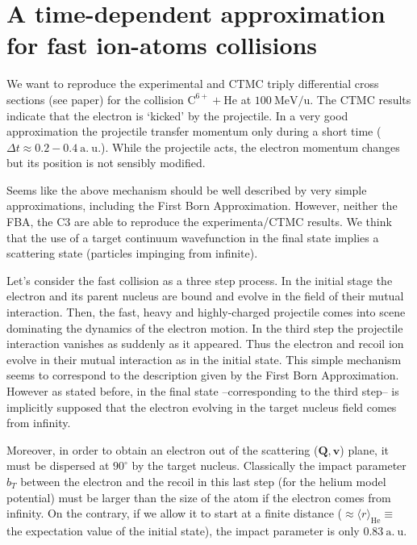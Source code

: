 \chapter{A time-dependent approximation for fast ion-atoms collisions}


We want to reproduce the experimental and CTMC triply differential
cross sections (see paper) for the collision $\mathrm{C}^{6+} +
\mathrm{He}$ at $100~\mathrm{MeV/u}$. The CTMC results indicate that
the electron is `kicked' by the projectile. In a very good
approximation the projectile transfer momentum only during a short time
($\Delta t \approx 0.2-0.4\mathrm{~a.~u.}$). While the projectile acts,
the electron momentum changes but its position is not sensibly
modified.

Seems like the above mechanism should be well described by very simple
approximations, including the First Born Approximation. However,
neither the FBA, the C3 are able to reproduce the experimenta/CTMC
results.
%
We think that the use of a target continuum wavefunction in the final
state implies a scattering state (particles impinging from infinite).

Let's consider the fast collision as a three step process. In the
initial stage the electron and its parent nucleus are bound and evolve
in the field of their mutual interaction. Then, the fast, heavy and
highly-charged projectile comes into scene dominating the dynamics of
the electron motion. In the third step the projectile interaction
vanishes as suddenly as it appeared. Thus the electron and recoil ion
evolve in their mutual interaction as in the initial state.
%
This simple mechanism seems to correspond to the description given by
the First Born Approximation. However as stated before, in the final
state --corresponding to the third step-- is implicitly supposed that
the electron evolving in the target nucleus field comes from infinity.

Moreover, in order to obtain an electron out of the scattering
($\bm{Q},\bm{v}$) plane, it must be dispersed at $90^{\circ}$ by the
target nucleus. Classically the impact parameter $b_{T}$ between the
electron and the recoil in this last step (for the helium model
potential) must be larger than the size of the atom if the electron
comes from infinity. On the contrary, if we allow it to start at a
finite distance ($\approx \langle r \rangle_{\mathrm{He}}\equiv$ the
expectation value of the initial state), the impact parameter is only
0.83$\mathrm{~a.~u.}$

\medskip

